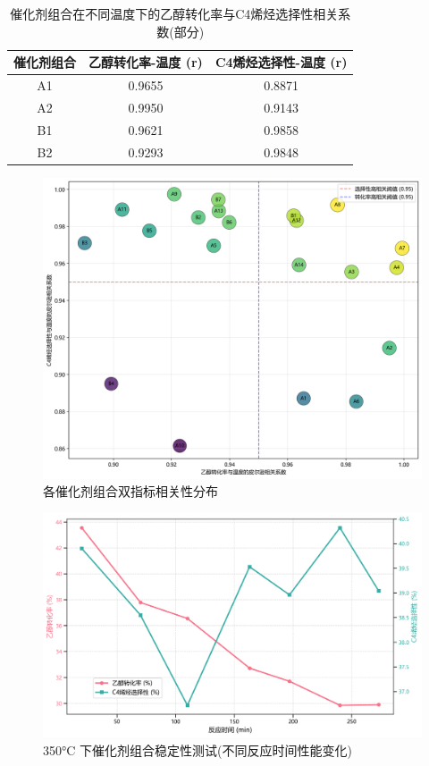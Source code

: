 \begin{table}[!htbp]
	\caption{催化剂组合在不同温度下的乙醇转化率与C4烯烃选择性相关系数(部分)}
	\centering
	\begin{tabular}{c c c}
		\hline
		\multicolumn{1}{c}{催化剂组合} & \multicolumn{1}{c}{乙醇转化率-温度 (r)} & \multicolumn{1}{c}{C4烯烃选择性-温度 (r)} \\
		\hline
		A1  & 0.9655 & 0.8871 \\
		A2  & 0.9950 & 0.9143 \\
		B1  & 0.9621 & 0.9858 \\
		B2  & 0.9293 & 0.9848 \\
		\hline
	\end{tabular}
	\label{tab:1}
\end{table}

\begin{figure}[h]%
	\centering%
	\includegraphics [scale=0.6]{图/1-2-2.png}
	\caption{各催化剂组合双指标相关性分布} 
	\label{fig:1}
\end{figure}

\begin{figure}[h]%
	\centering%
	\includegraphics [scale=0.6]{图/1-2-1.png}
	\caption{350°C 下催化剂组合稳定性测试(不同反应时间性能变化)} 
	\label{fig:1}
\end{figure}

